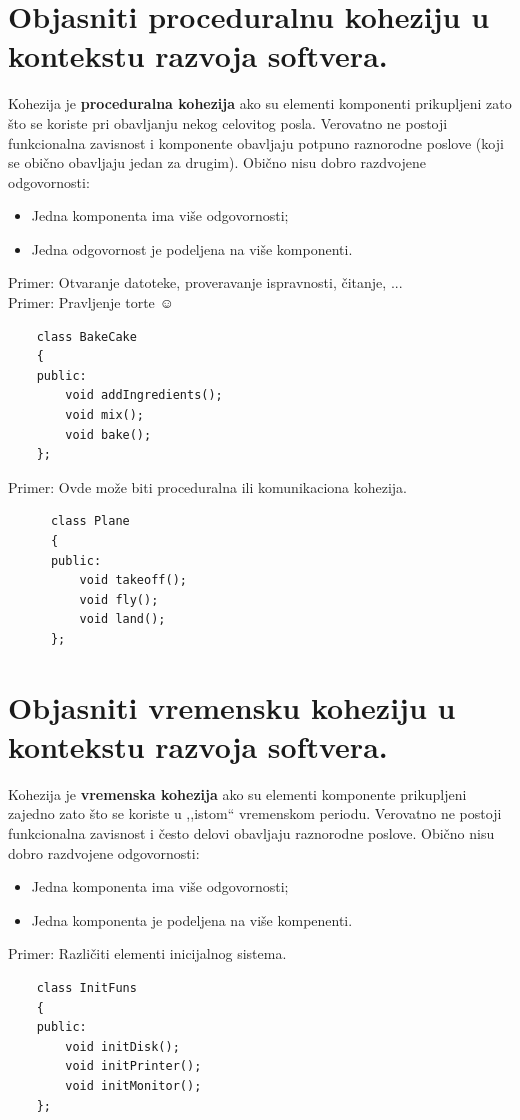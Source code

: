\documentclass[a4paper]{article}
\begin{document}
\section{Objasniti proceduralnu koheziju u kontekstu razvoja softvera.}
  Kohezija je \textbf{proceduralna kohezija} ako su elementi komponenti prikupljeni zato što
  se koriste pri obavljanju nekog celovitog posla. Verovatno ne postoji funkcionalna
  zavisnost i komponente obavljaju potpuno raznorodne poslove (koji se obično obavljaju
  jedan za drugim). Obično nisu dobro razdvojene odgovornosti:
  \begin{itemize}
    \item Jedna komponenta ima više odgovornosti;
    \item Jedna odgovornost je podeljena na više komponenti.
  \end{itemize}
  Primer: Otvaranje datoteke, proveravanje ispravnosti, čitanje, ...\\
  Primer: Pravljenje torte $\smiley{}$

  \begin{lstlisting}
    class BakeCake
    {
    public:
        void addIngredients();
        void mix();
        void bake();
    };\end{lstlisting}

    Primer: Ovde može biti proceduralna ili komunikaciona kohezija.
    \begin{lstlisting}
      class Plane
      {
      public:
          void takeoff();
          void fly();
          void land();
      };\end{lstlisting}

\section{Objasniti vremensku koheziju u kontekstu razvoja softvera.}
  Kohezija je \textbf{vremenska kohezija} ako su elementi komponente prikupljeni zajedno 
  zato što se koriste u ,,istom`` vremenskom periodu. Verovatno ne postoji funkcionalna zavisnost i
  često delovi obavljaju raznorodne poslove. Obično nisu dobro razdvojene odgovornosti: 
  \begin{itemize}
    \item Jedna komponenta ima više odgovornosti;
    \item Jedna komponenta je podeljena na više kompenenti.
  \end{itemize}
  Primer: Različiti elementi inicijalnog sistema. 

  \begin{lstlisting}
    class InitFuns
    {
    public:
        void initDisk();
        void initPrinter();
        void initMonitor();
    };\end{lstlisting}
\end{document}

